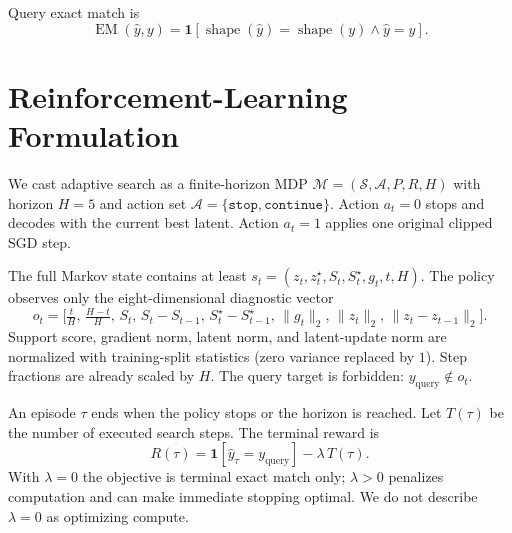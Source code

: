 \documentclass[11pt,a4paper]{article}
\begin{document}
Query exact match is
\begin{equation}
\operatorname{EM}(\widehat{y},y)
=
\mathbf{1}
\!\left[
\operatorname{shape}(\widehat{y})=\operatorname{shape}(y)
\land
\widehat{y}=y
\right].
\end{equation}

\section{Reinforcement-Learning Formulation}

We cast adaptive search as a finite-horizon MDP
$\mathcal{M}=(\mathcal{S},\mathcal{A},P,R,H)$
with horizon $H{=}5$ and action set
$\mathcal{A}=\{\texttt{stop},\texttt{continue}\}$.
Action $a_t{=}0$ stops and decodes with the current best latent.
Action $a_t{=}1$ applies one original clipped SGD step.

The full Markov state contains at least
$s_t=(z_t,z_t^\star,S_t,S_t^\star,g_t,t,H)$.
The policy observes only the eight-dimensional diagnostic vector
\begin{equation}
o_t
=
\Big[
\tfrac{t}{H},\,
\tfrac{H-t}{H},\,
S_t,\,
S_t-S_{t-1},\,
S_t^\star-S_{t-1}^\star,\,
\|g_t\|_2,\,
\|z_t\|_2,\,
\|z_t-z_{t-1}\|_2
\Big].
\end{equation}
Support score, gradient norm, latent norm, and latent-update norm are
normalized with training-split statistics (zero variance replaced by $1$).
Step fractions are already scaled by $H$.
The query target is forbidden: $y_{\mathrm{query}}\notin o_t$.

An episode $\tau$ ends when the policy stops or the horizon is reached.
Let $T(\tau)$ be the number of executed search steps.
The terminal reward is
\begin{equation}
R(\tau)
=
\mathbf{1}\!\left[\widehat{y}_\tau=y_{\mathrm{query}}\right]
-
\lambda\,T(\tau).
\end{equation}
With $\lambda{=}0$ the objective is terminal exact match only; $\lambda{>}0$
penalizes computation and can make immediate stopping optimal.
We do not describe $\lambda{=}0$ as optimizing compute.
\end{document}
